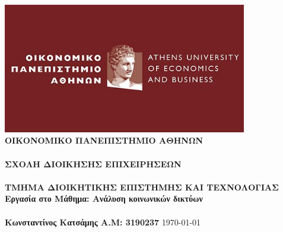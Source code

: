 \documentclass[12pt]{article}
\begin{document}
	
	\begin{titlepage}
		\centering
		\includegraphics[width=0.8\textwidth]{aueb_logo.jpg}
		\vfill
		\Large\textbf{ΟΙΚΟΝΟΜΙΚΟ ΠΑΝΕΠΙΣΤΗΜΙΟ ΑΘΗΝΩΝ}\\
		\Large\textbf{\\ΣΧΟΛΗ ΔΙΟΙΚΗΣΗΣ ΕΠΙΧΕΙΡΗΣΕΩΝ}\\
		\Large\textbf{\\ΤΜΗΜΑ ΔΙΟΙΚΗΤΙΚΗΣ ΕΠΙΣΤΗΜΗΣ ΚΑΙ ΤΕΧΝΟΛΟΓΙΑΣ}
		\vfill
		\large\textbf{\\Εργασία στο Μάθημα: Ανάλυση κοινωνικών δικτύων}\\
		\large\textbf{\\Κωνσταντίνος Κατσάμης Α.Μ: 3190237}
		\vfill
		\today
	\end{titlepage}
	
	
	
	
\end{document}
